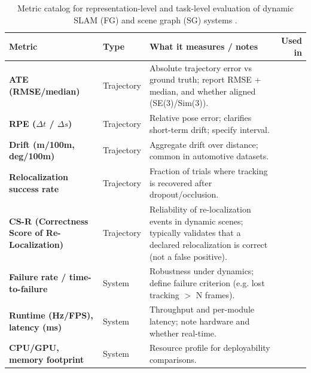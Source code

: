 \begin{table}[!htbp]
\caption{Metric catalog for representation-level and task-level evaluation of dynamic SLAM (FG) and scene graph (SG) systems .}
\label{tab:metrics_table}
\centering
\scriptsize
\setlength{\tabcolsep}{3pt}
\renewcommand{\arraystretch}{1.15}
\begin{tabularx}{\textwidth}{@{}X l X@{} r}
\toprule

\textbf{Metric} & \textbf{Type} & \textbf{What it measures / notes} & \textbf{Used in} \\

\midrule

\textbf{ATE (RMSE/median)} & Trajectory & 
Absolute trajectory error vs ground truth; report RMSE + median, and whether aligned (SE(3)/Sim(3)). 
& \cite{bescos_dynaslam_2021} \cite{morris_dynosam_2025} \cite{giberna_dynemo-slam_2025}\\
\textbf{RPE ($\Delta t$ / $\Delta s$)} & Trajectory & Relative pose error; clarifies short-term drift; specify interval. 
& \cite{bescos_dynaslam_2021} \cite{morris_dynosam_2025} \cite{morris_importance_2024}\\
\textbf{Drift (m/100m, deg/100m)} & Trajectory & 
Aggregate drift over distance; common in automotive datasets. 
& \cite{rosinol_kimera_2021}\\
\textbf{Relocalization success rate} & Trajectory & 
Fraction of trials where tracking is recovered after dropout/occlusion. 
& \cite{vega_torres_bim-slam_2023} \cite{wang_semantic_2023}\\
\textbf{CS-R (Correctness Score of Re-Localization)} & Trajectory &
Reliability of re-localization events in dynamic scenes; typically validates that a declared relocalization is correct (not a false positive). 
& \cite{wang_semantic_2023}\\
\textbf{Failure rate / time-to-failure} & System & 
Robustness under dynamics; define failure criterion (e.g. lost tracking $>$ N frames). 
& \cite{scherer_ogm2pgbm_2023}\\

\midrule

\textbf{Runtime (Hz/FPS), latency (ms)} & System & 
Throughput and per-module latency; note hardware and whether real-time. 
& \cite{behrens_lost_2025} \cite{bescos_dynaslam_2021} \cite{schmid_khronos_2024}\\
\textbf{CPU/GPU, memory footprint} & System & 
Resource profile for deployability comparisons. 
& \cite{ferraina_lost-3dsg_2026}\\


\end{tabularx}
\end{table}
